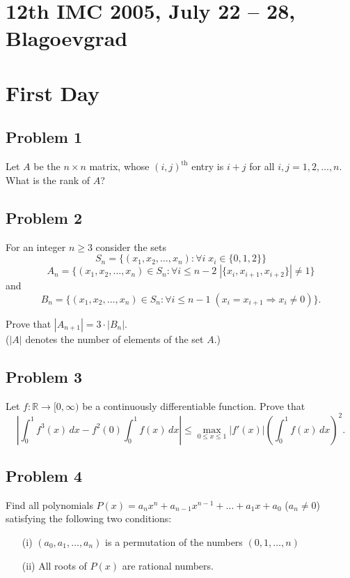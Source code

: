 \documentclass{article}
\begin{document}
\pagestyle{plain}

\section*{12th IMC 2005, July 22 -- 28, Blagoevgrad}

\section*{First Day}

\subsection*{Problem 1}
Let \( A \) be the \( n \times n \) matrix, whose \( (i,j)^{\text{th}} \) entry is \( i + j \) for all \( i, j = 1, 2, \ldots, n \). What is the rank of \( A \)?

\subsection*{Problem 2}
For an integer \( n \geq 3 \) consider the sets
\[
S_n = \{(x_1, x_2, \ldots, x_n) : \forall i \; x_i \in \{0,1,2\} \}
\]
\[
A_n = \{(x_1, x_2, \ldots, x_n) \in S_n : \forall i \leq n - 2 \; |\{x_i, x_{i+1}, x_{i+2}\}| \neq 1 \}
\]
and
\[
B_n = \{(x_1, x_2, \ldots, x_n) \in S_n : \forall i \leq n - 1 \; (x_i = x_{i+1} \Rightarrow x_i \neq 0)\}.
\]

Prove that \( |A_{n+1}| = 3 \cdot |B_n| \).\\
(\(|A|\) denotes the number of elements of the set \(A\).)

\subsection*{Problem 3}
Let \( f : \mathbb{R} \to [0, \infty) \) be a continuously differentiable function. Prove that
\[
\left| \int_0^1 f^3(x)\,dx - f^2(0) \int_0^1 f(x)\,dx \right|
\leq \max_{0 \leq x \leq 1} |f'(x)| \left( \int_0^1 f(x)\,dx \right)^2.
\]

\subsection*{Problem 4}
Find all polynomials \( P(x) = a_n x^n + a_{n-1} x^{n-1} + \ldots + a_1 x + a_0 \) (\( a_n \neq 0 \)) satisfying the following two conditions:
\begin{itemize}
    \item[(i)] \( (a_0, a_1, \ldots, a_n) \) is a permutation of the numbers \( (0, 1, \ldots, n) \)
    \item[(ii)] All roots of \( P(x) \) are rational numbers.
\end{itemize}
\end{document}
